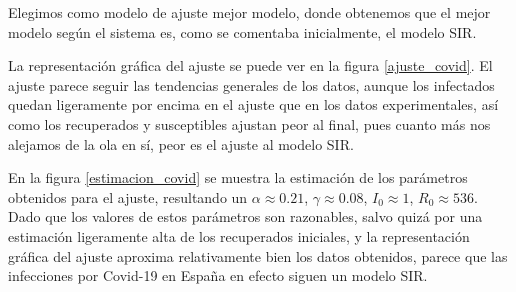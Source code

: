 Elegimos como modelo de ajuste mejor modelo, donde obtenemos que el mejor modelo según el sistema es, como se comentaba inicialmente, el modelo SIR.

La representación gráfica del ajuste se puede ver en la figura \ref{ajuste_covid}. El ajuste parece seguir las tendencias generales de los datos, aunque los infectados quedan ligeramente por encima en el ajuste que en los datos experimentales, así como los recuperados y susceptibles ajustan peor al final, pues cuanto más nos alejamos de la ola en sí, peor es el ajuste al modelo SIR.

En la figura \ref{estimacion_covid} se muestra la estimación de los parámetros obtenidos para el ajuste, resultando un $\alpha \approx 0.21$, $\gamma \approx 0.08$, $I_0 \approx 1$, $R_0 \approx 536$. Dado que los valores de estos parámetros son razonables, salvo quizá por una estimación ligeramente alta de los recuperados iniciales, y la representación gráfica del ajuste aproxima relativamente bien los datos obtenidos, parece que las infecciones por Covid-19 en España en efecto siguen un modelo SIR.













